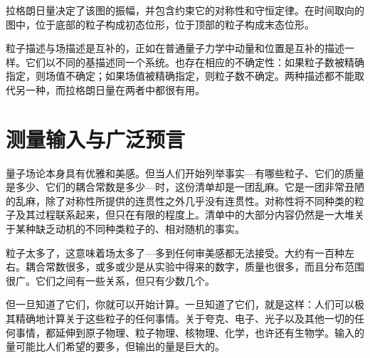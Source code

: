 拉格朗日量决定了该图的振幅，并包含约束它的对称性和守恒定律。在时间取向的图中，位于底部的粒子构成初态位形，位于顶部的粒子构成末态位形。

\begin{classroomqa}
\end{classroomqa}

粒子描述与场描述是互补的，正如在普通量子力学中动量和位置是互补的描述一样。它们以不同的基描述同一个系统。也存在相应的不确定性：如果粒子数被精确指定，则场值不确定；如果场值被精确指定，则粒子数不确定。两种描述都不能取代另一种，而拉格朗日量在两者中都很有用。

\begin{classroomqa}
\end{classroomqa}

\section{测量输入与广泛预言}

量子场论本身具有优雅和美感。但当人们开始列举事实---有哪些粒子、它们的质量是多少、它们的耦合常数是多少---时，这份清单却是一团乱麻。它是一团非常丑陋的乱麻，除了对称性所提供的连贯性之外几乎没有连贯性。对称性将不同种类的粒子及其过程联系起来，但只在有限的程度上。清单中的大部分内容仍然是一大堆关于某种缺乏动机的不同种类粒子的、相对随机的事实。

\begin{classroomqa}
\end{classroomqa}

粒子太多了，这意味着场太多了---多到任何审美感都无法接受。大约有一百种左右。耦合常数很多，或多或少是从实验中得来的数字，质量也很多，而且分布范围很广。它们之间有一些关系，但只有少数几个。

但一旦知道了它们，你就可以开始计算。一旦知道了它们，就是这样：人们可以极其精确地计算关于这些粒子的任何事情。关于夸克、电子、光子以及其他一切的任何事情，都延伸到原子物理、粒子物理、核物理、化学，也许还有生物学。输入的量可能比人们希望的要多，但输出的量是巨大的。


